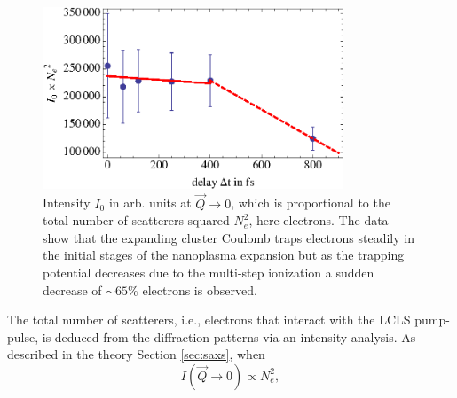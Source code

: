 \begin{figure}
	\centering
		\includegraphics[width=0.80\textwidth]{images/results/number-of-scatterer.eps}
	\caption[Time-resolved behavior of number of scatterers due to nanoplasma expansion]{Intensity $I_{0}$ in arb. units at $\vec{Q}\rightarrow 0$, which is proportional to the total number of scatterers squared $N_{e}^{2}$, here electrons. The data show that the expanding cluster Coulomb traps electrons steadily in the initial stages of the nanoplasma expansion but as the trapping potential decreases due to the multi-step ionization a sudden decrease of $\sim 65\%$ electrons is observed.}
	\label{fig:number-of-scatterer}
\end{figure}
The total number of scatterers, i.e., electrons that interact with the LCLS pump-pulse, is deduced from the diffraction patterns via an intensity analysis. As described in the theory Section \ref{sec:saxs}, when
\begin{equation}
I\left(\vec{Q}\rightarrow 0\right) \propto N_{e}^{2},
\label{eq:}
\end{equation}
